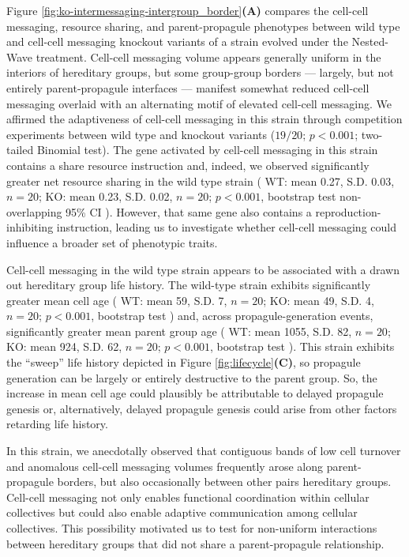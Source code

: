

Figure \ref{fig:ko-intermessaging-intergroup_border}\textbf{(A)} compares the cell-cell messaging, resource sharing, and parent-propagule phenotypes between wild type and cell-cell messaging knockout variants of a strain evolved under the Nested-Wave treatment.
Cell-cell messaging volume appears generally uniform in the interiors of hereditary groups, but some group-group borders --- largely, but not entirely parent-propagule interfaces --- manifest somewhat reduced cell-cell messaging overlaid with an alternating motif of elevated cell-cell messaging.
We affirmed the adaptiveness of cell-cell messaging in this strain through competition experiments between wild type and knockout variants ($19/20$; $p < 0.001$; two-tailed Binomial test).
The gene activated by cell-cell messaging in this strain contains a share resource instruction and, indeed, we observed significantly greater net resource sharing in the wild type strain
(%
WT: mean 0.27, S.D. 0.03, $n=20$;
KO: mean 0.23, S.D. 0.02, $n=20$;
$p < 0.001$, bootstrap test
non-overlapping 95\% CI%
). %
However, that same gene also contains a reproduction-inhibiting instruction, leading us to investigate whether cell-cell messaging could influence a broader set of phenotypic traits.

Cell-cell messaging in the wild type strain appears to be associated with a drawn out hereditary group life history.
The wild-type strain exhibits significantly greater mean cell age
(%
WT: mean 59, S.D. 7, $n=20$;
KO: mean 49, S.D. 4, $n=20$;
$p < 0.001$, bootstrap test%
) %
and, across propagule-generation events, significantly greater mean parent group age
(%
WT: mean 1055, S.D. 82, $n=20$;
KO: mean 924, S.D. 62, $n=20$;
$p < 0.001$, bootstrap test%
). %
This strain exhibits the ``sweep'' life history depicted in Figure \ref{fig:lifecycle}\textbf{(C)}, so propagule generation can be largely or entirely destructive to the parent group.
So, the increase in mean cell age could plausibly be attributable to delayed propagule genesis or, alternatively, delayed propagule genesis could arise from other factors retarding life history.

In this strain, we anecdotally observed that contiguous bands of low cell turnover and anomalous cell-cell messaging volumes frequently arose along parent-propagule borders, but also occasionally between other pairs hereditary groups.
Cell-cell messaging not only enables functional coordination within cellular collectives but could also enable adaptive communication among cellular collectives.
This possibility motivated us to test for non-uniform interactions between hereditary groups that did not share a parent-propagule relationship.

